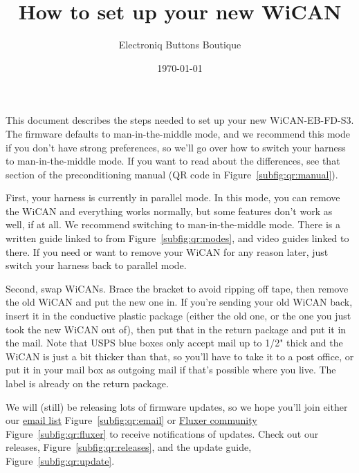 \documentclass[superscriptaddress,onecolumn,floatfix]{revtex4-2}
\begin{document}
                            
\title{How to set up your new WiCAN}
\author{Electroniq Buttons Boutique}
\date{\today}

\maketitle

This document describes the steps needed to set up your new WiCAN-EB-FD-S3. The firmware defaults to man-in-the-middle mode, and we recommend this mode if you don't have strong preferences, so we'll go over how to switch your harness to man-in-the-middle mode. If you want to read about the differences, see that section of the preconditioning manual (QR code in Figure~\ref{subfig:qr:manual}).

First, your harness is currently in parallel mode. In this mode, you can remove the WiCAN and everything works normally, but some features don't work as well, if at all. We recommend switching to man-in-the-middle mode. There is a written guide linked to from Figure~\ref{subfig:qr:modes}, and video guides linked to there. If you need or want to remove your WiCAN for any reason later, just switch your harness back to parallel mode. 

Second, swap WiCANs. Brace the bracket to avoid ripping off tape, then remove the old WiCAN and put the new one in. If you're sending your old WiCAN back, insert it in the conductive plastic package (either the old one, or the one you just took the new WiCAN out of), then put that in the return package and put it in the mail. Note that USPS blue boxes only accept mail up to 1/2" thick and the WiCAN is just a bit thicker than that, so you'll have to take it to a post office, or put it in your mail box as outgoing mail if that's possible where you live. The label is already on the return package. 

We will (still) be releasing lots of firmware updates, so we hope you'll join either our \href{https://docs.google.com/forms/d/e/1FAIpQLSd8GtjELMu9Nn59Qep1Qt1Ey02MGxPplVcpOBm7KX2CQ7S9JQ/viewform?usp=sharing&ouid=113251294956098361139}{email list} Figure~\ref{subfig:qr:email} or \href{https://fluxer.gg/8FV7gPtN}{Fluxer community} Figure~\ref{subfig:qr:fluxer} to receive notifications of updates. Check out our releases, Figure~\ref{subfig:qr:releases}, and the update guide, Figure~\ref{subfig:qr:update}.
\end{document}
